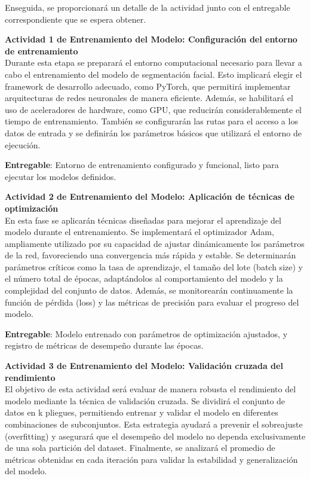  Enseguida, se proporcionará un detalle de la actividad junto con el entregable correspondiente que se espera obtener.
 
 \textbf{Actividad 1 de Entrenamiento del Modelo: Configuración del entorno de entrenamiento}
 \\
 Durante esta etapa se preparará el entorno computacional necesario para llevar a cabo el entrenamiento del modelo de segmentación facial. Esto implicará elegir el framework de desarrollo adecuado, como PyTorch, que permitirá implementar arquitecturas de redes neuronales de manera eficiente. Además, se habilitará el uso de aceleradores de hardware, como GPU, que reducirán considerablemente el tiempo de entrenamiento. También se configurarán las rutas para el acceso a los datos de entrada y se definirán los parámetros básicos que utilizará el entorno de ejecución.

 \textbf{Entregable}: Entorno de entrenamiento configurado y funcional, listo para ejecutar los modelos definidos.

 \textbf{Actividad 2 de Entrenamiento del Modelo: Aplicación de técnicas de optimización}
 \\
 En esta fase se aplicarán técnicas diseñadas para mejorar el aprendizaje del modelo durante el entrenamiento. Se implementará el optimizador Adam, ampliamente utilizado por su capacidad de ajustar dinámicamente los parámetros de la red, favoreciendo una convergencia más rápida y estable. Se determinarán parámetros críticos como la tasa de aprendizaje, el tamaño del lote (batch size) y el número total de épocas, adaptándolos al comportamiento del modelo y la complejidad del conjunto de datos. Además, se monitorearán continuamente la función de pérdida (loss) y las métricas de precisión para evaluar el progreso del modelo.

 \textbf{Entregable}: Modelo entrenado con parámetros de optimización ajustados, y registro de métricas de desempeño durante las épocas.

 \textbf{Actividad 3 de Entrenamiento del Modelo: Validación cruzada del rendimiento}
 \\
 El objetivo de esta actividad será evaluar de manera robusta el rendimiento del modelo mediante la técnica de validación cruzada. Se dividirá el conjunto de datos en k pliegues, permitiendo entrenar y validar el modelo en diferentes combinaciones de subconjuntos. Esta estrategia ayudará a prevenir el sobreajuste (overfitting) y asegurará que el desempeño del modelo no dependa exclusivamente de una sola partición del dataset. Finalmente, se analizará el promedio de métricas obtenidas en cada iteración para validar la estabilidad y generalización del modelo.

